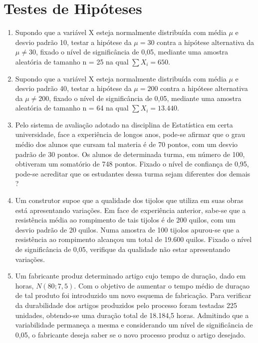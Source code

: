 \chapter{Testes de Hipóteses}

\begin{enumerate}[resume]

\item Supondo que a variável X esteja normalmente distribuída com média $\mu$ e desvio padrão 10, testar a hipótese da $\mu= 30$ contra a hipótese alternativa da $\mu \neq 30$, fixado o nível de significância de 0,05, mediante uma amostra aleatória de tamanho n = 25 na qual $\sum X_{i} = 650$.

\item Supondo que a variável X esteja normalmente distribuída com média $\mu$ e desvio padrão 40, testar a hipótese da $\mu= 200$ contra a hipótese alternativa da $\mu \neq 200$, fixado o nível de significância de 0,05, mediante uma amostra aleatória de tamanho n = 64 na qual $\sum X_{i} = 13.440$.

\item Pelo sistema de avaliação adotado na disciplina de Estatística em certa universidade, face a experiência de longos anos, pode-se afirmar que o grau médio dos alunos que cursam tal materia é de 70 pontos, com um desvio padrão de 30 pontos. Os alunos de determinada turma, em número de 100, obtiveram um somatório de 748 pontos. Fixado o nível de confiança de 0,95, pode-se acreditar que os estudantes dessa turma sejam diferentes dos demais ?

\item Um construtor supoe que a qualidade dos tijolos que utiliza em suas obras está apresentando variações. Em face de experiência anterior, sabe-se que a resistência média ao rompimento de tais tijolos é de 200 quilos, com um desvio padrão de 20 quilos. Numa amostra de 100 tijolos apurou-se que a resistência ao rompimento alcançou um total de 19.600 quilos. Fixado o nível de significância de 0,05, verifique da qualidade não estar apresentando variações.

\item Um fabricante produz determinado artigo cujo tempo de duração, dado em horas,  $N(80 ; 7,5)$. Com o objetivo de aumentar o tempo médio de duraçao de tal produto foi introduzido um novo esquema de fabricação. Para verificar da durabilidade dos artigos produzidos pelo processo foram testadas 225 unidades, obtendo-se uma duração total de 18.184,5 horas. Admitindo que a variabilidade permaneça a mesma e considerando um nível de significância de 0,05, o fabricante deseja saber se o novo processo produz o artigo desejado.


\end{enumerate}
